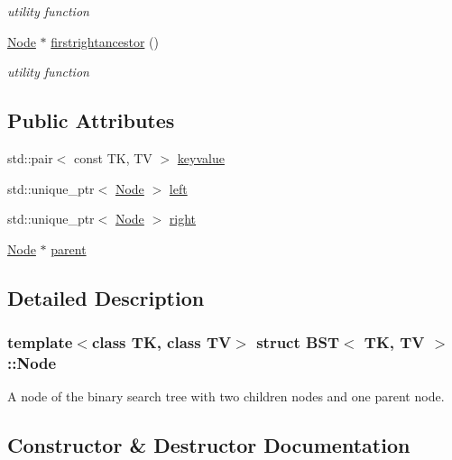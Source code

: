 \begin{DoxyCompactItemize}
\begin{DoxyCompactList}\small\item\em utility function \end{DoxyCompactList}\item 
\mbox{\label{structBST_1_1Node_a90b28f6bc78cd44c4f01fa98b6b571f2}} 
\hyperlink{structBST_1_1Node}{Node} $\ast$ \hyperlink{structBST_1_1Node_a90b28f6bc78cd44c4f01fa98b6b571f2}{firstrightancestor} ()
\begin{DoxyCompactList}\small\item\em utility function \end{DoxyCompactList}\end{DoxyCompactItemize}
\subsection*{Public Attributes}
\begin{DoxyCompactItemize}
\item 
std\+::pair$<$ const TK, TV $>$ \hyperlink{structBST_1_1Node_a2ecbd07318d0f15613f60cccbdf10ac2}{keyvalue}
\item 
std\+::unique\+\_\+ptr$<$ \hyperlink{structBST_1_1Node}{Node} $>$ \hyperlink{structBST_1_1Node_ac52d495eea342da75bb8970963fedc4c}{left}
\item 
std\+::unique\+\_\+ptr$<$ \hyperlink{structBST_1_1Node}{Node} $>$ \hyperlink{structBST_1_1Node_ac470075bea90a9c6bf396ca24b557908}{right}
\item 
\hyperlink{structBST_1_1Node}{Node} $\ast$ \hyperlink{structBST_1_1Node_a645580e661f788dc0f0ad62271b26710}{parent}
\end{DoxyCompactItemize}


\subsection{Detailed Description}
\subsubsection*{template$<$class TK, class TV$>$\newline
struct B\+S\+T$<$ T\+K, T\+V $>$\+::\+Node}

A node of the binary search tree with two children nodes and one parent node. 

\subsection{Constructor \& Destructor Documentation}
\mbox{\label{structBST_1_1Node_a4b1c0c1a0a0b458bc32e28364795debe}} 
